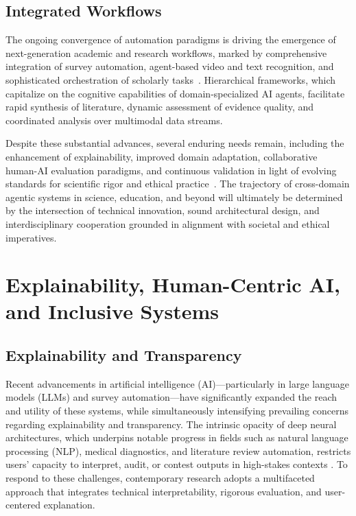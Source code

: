\subsection{Integrated Workflows}

The ongoing convergence of automation paradigms is driving the emergence of next-generation academic and research workflows, marked by comprehensive integration of survey automation, agent-based video and text recognition, and sophisticated orchestration of scholarly tasks~\cite{ref25,ref26,ref27,ref29,ref30,ref45,ref86,ref99,ref100,ref104,ref110,ref111,ref113}. Hierarchical frameworks, which capitalize on the cognitive capabilities of domain-specialized AI agents, facilitate rapid synthesis of literature, dynamic assessment of evidence quality, and coordinated analysis over multimodal data streams. 

Despite these substantial advances, several enduring needs remain, including the enhancement of explainability, improved domain adaptation, collaborative human-AI evaluation paradigms, and continuous validation in light of evolving standards for scientific rigor and ethical practice~\cite{ref30,ref45,ref86,ref99,ref100,ref104,ref110,ref111,ref113,ref114,ref115}. The trajectory of cross-domain agentic systems in science, education, and beyond will ultimately be determined by the intersection of technical innovation, sound architectural design, and interdisciplinary cooperation grounded in alignment with societal and ethical imperatives.

\section{Explainability, Human-Centric AI, and Inclusive Systems}

\subsection{Explainability and Transparency}

Recent advancements in artificial intelligence (AI)—particularly in large language models (LLMs) and survey automation—have significantly expanded the reach and utility of these systems, while simultaneously intensifying prevailing concerns regarding explainability and transparency. The intrinsic opacity of deep neural architectures, which underpins notable progress in fields such as natural language processing (NLP), medical diagnostics, and literature review automation, restricts users’ capacity to interpret, audit, or contest outputs in high-stakes contexts \cite{ref36,ref38,ref39,ref46,ref47,ref62,ref63,ref64,ref65,ref68,ref76,ref80,ref82,ref83,ref102,ref103,ref106}. To respond to these challenges, contemporary research adopts a multifaceted approach that integrates technical interpretability, rigorous evaluation, and user-centered explanation.

